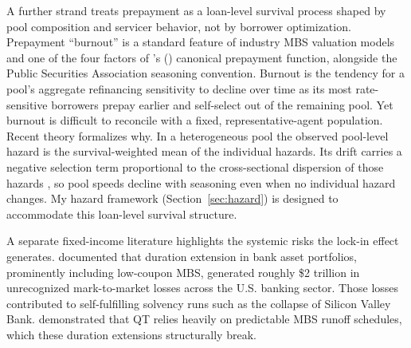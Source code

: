 \documentclass[12pt]{article}
\newcommand{\citepos}[1]{\citeauthor{#1}'s (\citeyear{#1})}
\begin{document}
A further strand treats prepayment as a loan-level survival process shaped by pool composition and servicer behavior, not by borrower optimization. Prepayment ``burnout'' is a standard feature of industry MBS valuation models and one of the four factors of \citepos{richard1989} canonical prepayment function, alongside the Public Securities Association seasoning convention. Burnout is the tendency for a pool's aggregate refinancing sensitivity to decline over time as its most rate-sensitive borrowers prepay earlier and self-select out of the remaining pool. Yet burnout is difficult to reconcile with a fixed, representative-agent population. Recent theory formalizes why. In a heterogeneous pool the observed pool-level hazard is the survival-weighted mean of the individual hazards. Its drift carries a negative selection term proportional to the cross-sectional dispersion of those hazards \citep[arXiv preprint]{lesniewski2026}, so pool speeds decline with seasoning even when no individual hazard changes. My hazard framework (Section~\ref{sec:hazard}) is designed to accommodate this loan-level survival structure.

A separate fixed-income literature highlights the systemic risks the lock-in effect generates. \citet{jiang2023} documented that duration extension in bank asset portfolios, prominently including low-coupon MBS, generated roughly \$2 trillion in unrecognized mark-to-market losses across the U.S. banking sector. Those losses contributed to self-fulfilling solvency runs such as the collapse of Silicon Valley Bank. \citet{smith2023} demonstrated that QT relies heavily on predictable MBS runoff schedules, which these duration extensions structurally break.
\end{document}
